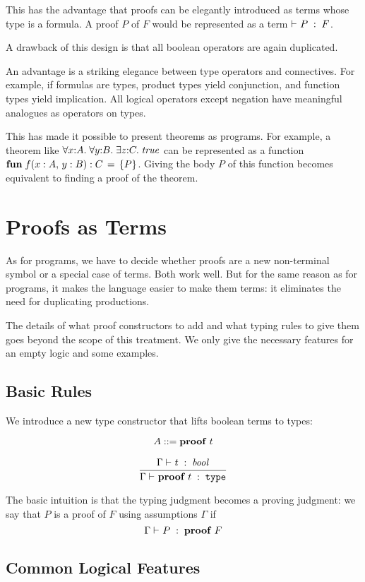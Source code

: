 This has the advantage that proofs can be elegantly introduced as terms whose type is a formula.
A proof $P$ of $F$ would be represented as a term $\vdash^{}_{}P\;:\;F$.

A drawback of this design is that all boolean operators are again duplicated.

An advantage is a striking elegance between type operators and connectives.
For example, if formulas are types, product types yield conjunction, and function types yield implication.
All logical operators except negation have meaningful analogues as operators on types.

This has made it possible to present theorems as programs.
For example, a theorem like $\afa[A]{x}{\afa[B]{y}{\aex[C]{z}{\true}}}$ can be represented as a function $\afunI[C]{f}{x:A,y:B}{P}$.
Giving the body $P$ of this function becomes equivalent to finding a proof of the theorem.

\section{Proofs as Terms}

As for programs, we have to decide whether proofs are a new non-terminal symbol or a special case of terms.
Both work well.
But for the same reason as for programs, it makes the language easier to make them terms: it eliminates the need for duplicating productions.

The details of what proof constructors to add and what typing rules to give them goes beyond the scope of this treatment.
We only give the necessary features for an empty logic and some examples.

\subsection{Basic Rules}

We introduce a new type constructor that lifts boolean terms to types:

\[A ::= {\rm \bf proof}\; t\]

\[\cfrac{\Gamma\vdash^{}_{}t\;:\;\mathit{bool}}{\Gamma\vdash^{}_{}{\rm \bf proof}\; t\;:\;\mathtt{type}}\,\]

The basic intuition is that the typing judgment becomes a proving judgment: we say that $P$ is a proof of $F$ using assumptions $\Gamma$ if
\[\Gamma\vdash^{}_{}P\;:\;{\rm \bf proof}\; F\]

\subsection{Common Logical Features}

